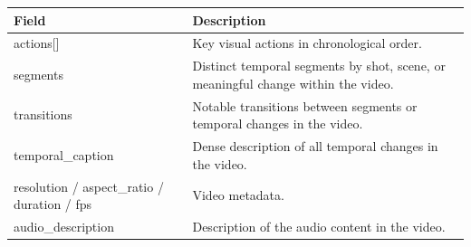 \begin{tcolorbox}[
    colback=black!2,
    colframe=nvidiagreen!75!white,
    boxrule=0.4pt,
    arc=1pt,
    left=4pt,
    right=4pt,
    top=4pt,
    bottom=4pt,
    title=Additional Top-level Fields in the Video Caption Schema
]
\small
\renewcommand{\arraystretch}{1.1}
\begin{tabularx}{\linewidth}{@{}>{\ttfamily}lX@{}}
\toprule
Field & Description \\
\midrule
actions[] & Key visual actions in chronological order. \\
segments & Distinct temporal segments by shot, scene, or meaningful change within the video. \\
transitions & Notable transitions between segments or temporal changes in the video. \\
temporal\_caption & Dense description of all temporal changes in the video. \\
resolution / aspect\_ratio / duration / fps & Video metadata. \\
audio\_description & Description of the audio content in the video. \\
\bottomrule
\end{tabularx}
\end{tcolorbox}
